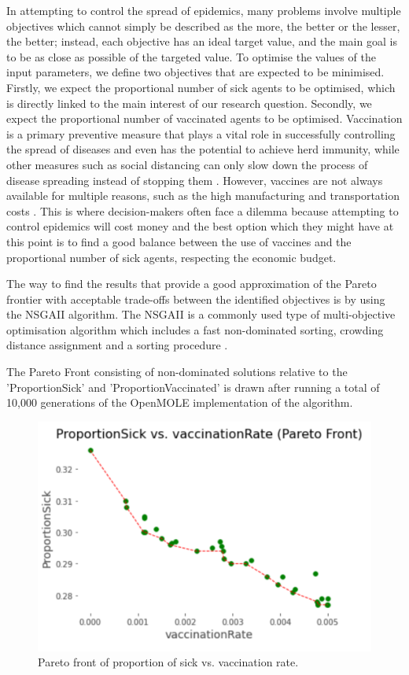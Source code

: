 \documentclass[smallextended]{svjour3}       %
\begin{document}
In attempting to control the spread of epidemics, many problems involve multiple objectives which cannot simply be described as the more, the better or the lesser, the better; instead, each objective has an ideal target value, and the main goal is to be as close as possible of the targeted value. To optimise the values of the input parameters, we define two objectives that are expected to be minimised. Firstly, we expect the proportional number of sick agents to be optimised, which is directly linked to the main interest of our research question. Secondly, we expect the proportional number of vaccinated agents to be optimised. Vaccination is a primary preventive measure that plays a vital role in successfully controlling the spread of diseases and even has the potential to achieve herd immunity, while other measures such as social distancing can only slow down the process of disease spreading instead of stopping them \cite{bicher2022model}. However, vaccines are not always available for multiple reasons, such as the high manufacturing and transportation costs \cite{plotkin2017complexity}. This is where decision-makers often face a dilemma because attempting to control epidemics will cost money and the best option which they might have at this point is to find a good balance between the use of vaccines and the proportional number of sick agents, respecting the economic budget.

The way to find the results that provide a good approximation of the Pareto frontier with acceptable trade-offs between the identified objectives is by using the NSGAII algorithm. The NSGAII is a commonly used type of multi-objective optimisation algorithm which includes a fast non-dominated sorting, crowding distance assignment and a sorting procedure \cite{deb2002fast}.

The Pareto Front consisting of non-dominated solutions relative to the 'ProportionSick' and 'ProportionVaccinated' is drawn after running a total of 10,000 generations of the OpenMOLE implementation of the algorithm.


\begin{figure}
	\centering
	\includegraphics[width=\linewidth]{figures/pareto.png}
	\caption{Pareto front of proportion of sick vs. vaccination rate.\label{fig:pareto}}	
\end{figure}
\end{document}

